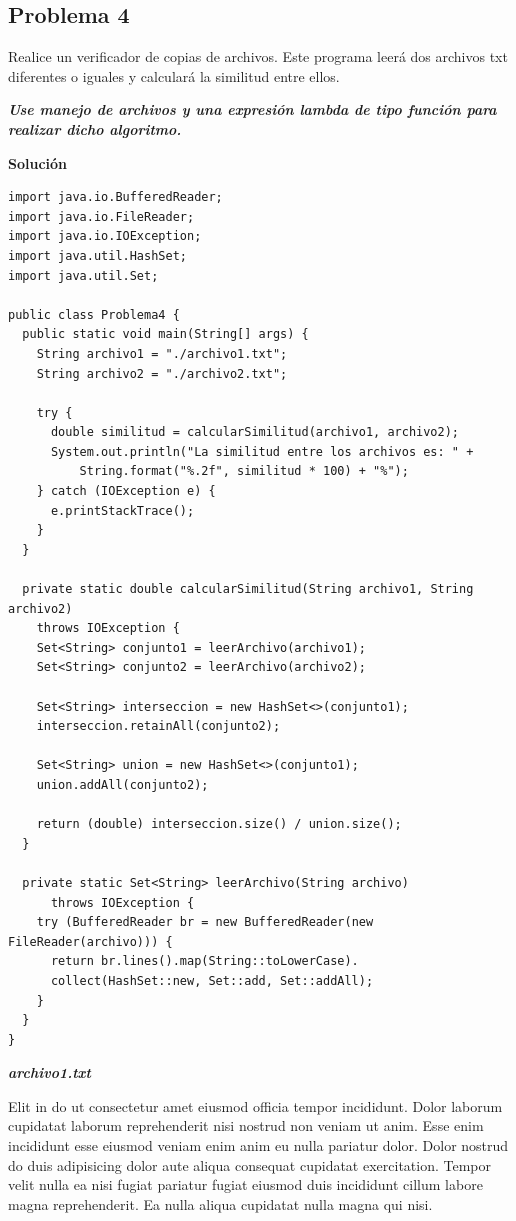 \documentclass[11pt, twocolumn]{article}
\begin{document}
  \subsection*{Problema 4}
  Realice un verificador de copias de archivos. Este programa leerá dos archivos txt diferentes o iguales y calculará la similitud entre ellos.

  \textit{\textbf{Use manejo de archivos y una expresión lambda de tipo función para realizar dicho algoritmo.}}

  \textbf{Solución}
  \begin{lstlisting}
import java.io.BufferedReader;
import java.io.FileReader;
import java.io.IOException;
import java.util.HashSet;
import java.util.Set;

public class Problema4 {
  public static void main(String[] args) {
    String archivo1 = "./archivo1.txt";
    String archivo2 = "./archivo2.txt";

    try {
      double similitud = calcularSimilitud(archivo1, archivo2);
      System.out.println("La similitud entre los archivos es: " + 
          String.format("%.2f", similitud * 100) + "%");
    } catch (IOException e) {
      e.printStackTrace();
    }
  }

  private static double calcularSimilitud(String archivo1, String archivo2) 
    throws IOException {
    Set<String> conjunto1 = leerArchivo(archivo1);
    Set<String> conjunto2 = leerArchivo(archivo2);

    Set<String> interseccion = new HashSet<>(conjunto1);
    interseccion.retainAll(conjunto2);

    Set<String> union = new HashSet<>(conjunto1);
    union.addAll(conjunto2);

    return (double) interseccion.size() / union.size();
  }

  private static Set<String> leerArchivo(String archivo) 
      throws IOException {
    try (BufferedReader br = new BufferedReader(new FileReader(archivo))) {
      return br.lines().map(String::toLowerCase).
      collect(HashSet::new, Set::add, Set::addAll);
    }
  }
}
  \end{lstlisting}

  \textit{\textbf{archivo1.txt}} 

  \begin{tiny}
    \ttfamily

    Elit in do ut consectetur amet eiusmod officia tempor incididunt. Dolor laborum cupidatat laborum reprehenderit nisi nostrud non veniam ut anim. Esse enim incididunt esse eiusmod veniam enim anim eu nulla pariatur dolor. Dolor nostrud do duis adipisicing dolor aute aliqua consequat cupidatat exercitation. Tempor velit nulla ea nisi fugiat pariatur fugiat eiusmod duis incididunt cillum labore magna reprehenderit. Ea nulla aliqua cupidatat nulla magna qui nisi.
  \end{tiny}
\end{document}
